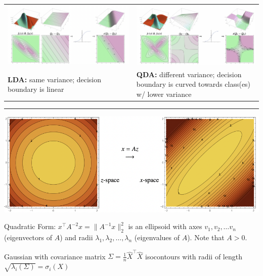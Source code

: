 \documentclass[10pt,landscape]{article}
\begin{document}
\begin{multicols}{3}
\begin{tabular}{@{}p{}@{\hskip 0.5cm}@{}p{}@{}}
\includegraphics[width=\linewidth/8*7]{LDA_Isocontours.png} & \includegraphics[width=\linewidth/8*7]{QDA_Isocontours.png} \\
 \textbf{LDA:} same variance; decision boundary is linear & \textbf{QDA:} different variance; decision boundary is curved towards class(es) w/ lower variance 
\end{tabular} \vspace{0.5em} 
\hrule \vspace{0.5em}
 \includegraphics[height = 1 in]{Quadratic_Isosurface.png}
 
 Quadratic Form: $x^{\top}A^{-2}x = \| A^{-1}x\|_2^2$ is an ellipsoid with axes $v_1, v_2, \dots v_n$ (eigenvectors of $A$) and radii $\lambda_1, \lambda_2, \dots, \lambda_n$ (eigenvalues of $A$). Note that $A > 0$.
 
 Gaussian with covariance matrix $\Sigma = \frac{1}{n} \hat{X}^{\top} \hat{X}$ isocontours with radii of length $\sqrt{\lambda_i(\Sigma)} = \sigma_i(X)$


\end{multicols}
\end{document}
